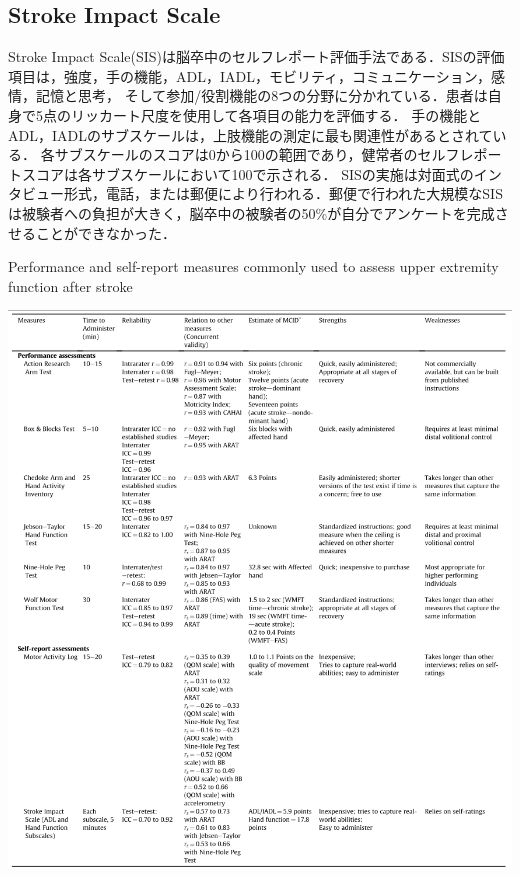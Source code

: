 \subsection*{Stroke Impact Scale}
Stroke Impact Scale(SIS)\cite{Lin2010b,Lin2010a,Lai2002,Duncan2001,Duncan2002,Duncan2002a,Duncan2003}は脳卒中のセルフレポート評価手法である．SISの評価項目は，強度，手の機能，ADL，IADL，モビリティ，コミュニケーション，感情，記憶と思考，
そして参加/役割機能の8つの分野に分かれている．患者は自身で5点のリッカート尺度を使用して各項目の能力を評価する．
手の機能とADL，IADLのサブスケールは，上肢機能の測定に最も関連性があるとされている．
各サブスケールのスコアは0から100の範囲であり，健常者のセルフレポートスコアは各サブスケールにおいて100で示される．
SISの実施は対面式のインタビュー形式，電話，または郵便により行われる．郵便で行われた大規模なSISは被験者への負担が大きく，脳卒中の被験者の50\%が自分でアンケートを完成させることができなかった．

\begin{table}[H]
  \centering  
  \caption{Performance and self-report measures commonly used to assess upper extremity function after stroke\cite{Lang2013}}
  \includegraphics[width=1.0\linewidth]{fig/table1}
  \label{table:measure}
\end{table}
\fi

